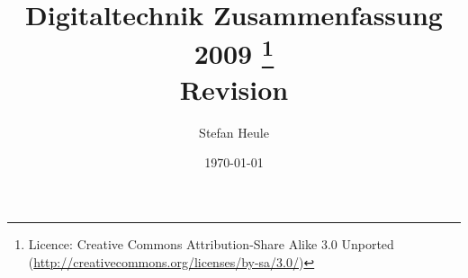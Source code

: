\documentclass[portrait,a4paper,titlepage]{article}
\begin{document}
\author{Stefan Heule}
\title{Digitaltechnik Zusammenfassung 2009
\thanks{Licence: Creative Commons Attribution-Share Alike 3.0 Unported (\url{http://creativecommons.org/licenses/by-sa/3.0/})}
{\\ \small Revision \svnrev}
}
\date{\today}
\maketitle














\clearpage
\end{document}
